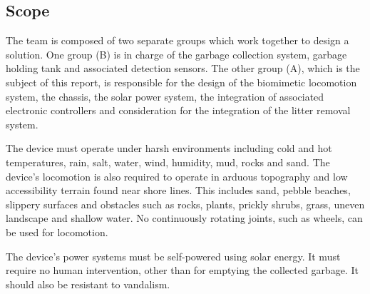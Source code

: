 \subsection{Scope}

The team is composed of two separate groups which work together to design a solution. One group (B) is in charge of the garbage collection system, garbage holding tank and associated detection sensors. The other group (A), which is the subject of this report, is responsible for the design of the biomimetic locomotion system, the chassis, the solar power system, the integration of associated electronic controllers and consideration for the integration of the litter removal system.

The device must operate under harsh environments including cold and hot temperatures, rain, salt, water, wind, humidity, mud, rocks and sand. The device's locomotion is also required to operate in arduous topography and low accessibility terrain found near shore lines. This includes sand, pebble beaches, slippery surfaces and obstacles such as rocks, plants, prickly shrubs, grass, uneven landscape and shallow water. No continuously rotating joints, such as wheels, can be used for locomotion.

The device's power systems must be self-powered using solar energy. It must require no human intervention, other than for emptying the collected garbage. It should also be resistant to vandalism. 